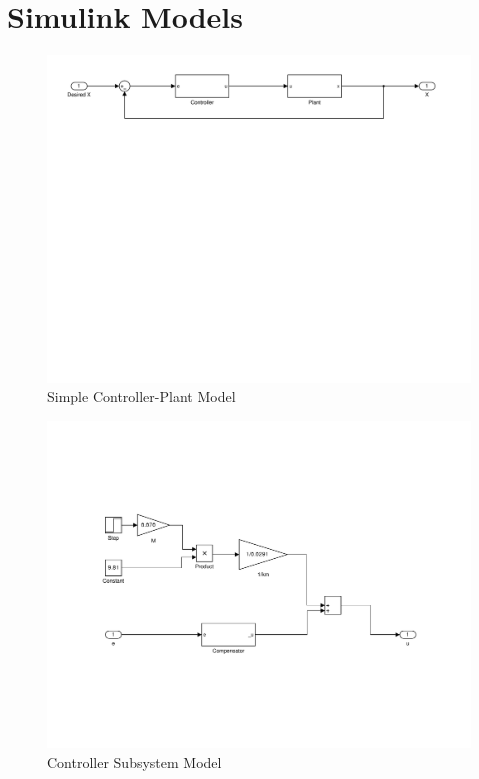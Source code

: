 \documentclass{article}
\begin{document}
\section*{Simulink Models}
{
\begin{figure}[h]
\includegraphics[width=14cm]{PlantModel.pdf}
\caption{Simple Controller-Plant Model}
\end{figure}

\pagebreak

\begin{figure}[h]
\includegraphics[width=14cm]{ControllerModel.pdf}
\caption{Controller Subsystem Model}
\end{figure}

}
\end{document}
